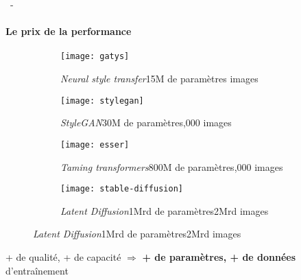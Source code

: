 \documentclass[aspectratio=169, 22pt]{beamer}
\begin{document}
\begin{frame}{\secname~- \subsecname}
  \framesubtitle{Le prix de la performance}
  \begin{figure}
    \begin{subfigure}[t]{0.24\linewidth}\centering
      \texttt{[image: gatys]}
      \caption{{\emph{Neural style transfer}\newline[Gatys et al., 2014]\newline 15M de paramètres images}}
    \end{subfigure}
    \begin{subfigure}[t]{0.24\linewidth}\centering
      \texttt{[image: stylegan]}                
      \caption{{\emph{StyleGAN}\newline[Karras et al., 2019]\newline 30M de paramètres,000 images}}
    \end{subfigure}
    \begin{subfigure}[t]{0.24\linewidth}\centering
      \texttt{[image: esser]}                      
      \caption{\emph{Taming transformers}\newline[Esser et al., 2021]\newline 800M de paramètres,000 images}
    \end{subfigure}
    \begin{subfigure}[t]{0.24\linewidth}\centering
      \texttt{[image: stable-diffusion]}
      \caption{\emph{Latent Diffusion}\newline[Rombach et al., 2022]\newline 1Mrd de paramètres\newline 2Mrd images}
    \end{subfigure}
  \end{figure}
  \begin{exampleblock}{}
    \centering
    + de qualité, + de capacité $\Rightarrow$ \textbf{+ de \alert{paramètres}, + de \alert{données}}  d'entraînement
  \end{exampleblock}
\end{frame}
\end{document}
